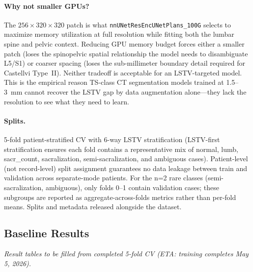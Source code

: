 \documentclass{article}
\begin{document}
\paragraph{Why not smaller GPUs?}
The $256\!\times\!320\!\times\!320$ patch is what
\texttt{nnUNetResEncUNetPlans\_100G} selects to maximize memory
utilization at full resolution while fitting both the lumbar spine
and pelvic context.
Reducing GPU memory budget forces either a smaller patch (loses the
spinopelvic spatial relationship the model needs to disambiguate
L5/S1) or coarser spacing (loses the sub-millimeter boundary
detail required for Castellvi Type~II).
Neither tradeoff is acceptable for an LSTV-targeted model.
This is the empirical reason TS-class CT segmentation models
trained at 1.5--3~mm cannot recover the LSTV gap by data
augmentation alone---they lack the resolution to see what they
need to learn.

\paragraph{Splits.}
5-fold patient-stratified CV with 6-way LSTV stratification
(LSTV-first stratification ensures each fold contains a
representative mix of normal, lumb, sacr\_count, sacralization,
semi-sacralization, and ambiguous cases).
Patient-level (not record-level) split assignment guarantees no
data leakage between train and validation across separate-mode
patients.
For the n=2 rare classes (semi-sacralization, ambiguous), only
folds 0--1 contain validation cases; these subgroups are reported
as aggregate-across-folds metrics rather than per-fold means.
Splits and metadata released alongside the dataset.

\subsection{Baseline Results}

\textit{Result tables to be filled from completed 5-fold CV
(ETA: training completes May 5, 2026).}
\end{document}

